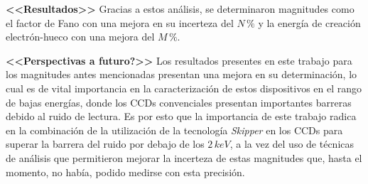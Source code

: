 \textbf{<<Resultados>>} Gracias a estos análisis, se determinaron magnitudes como el factor de Fano con una mejora en su incerteza del $N\,\%$ y la energía de creación electrón-hueco con una mejora del $M\,\%$.

\textbf{<<Perspectivas a futuro?>>} Los resultados presentes en este trabajo para los magnitudes antes mencionadas presentan una mejora en su determinación, lo cual es de vital importancia en la caracterización de estos dispositivos en el rango de bajas energías, donde los CCDs convenciales presentan importantes barreras debido al ruido de lectura. Es por esto que la importancia de este trabajo radica en la combinación de la utilización de la tecnología \textit{Skipper} en los CCDs para superar la barrera del ruido por debajo de los $2\,\si{keV}$, a la vez del uso de técnicas de análisis que permitieron mejorar la incerteza de estas magnitudes que, hasta el momento, no había, podido medirse con esta precisión.



\newpage
\thispagestyle{empty} \mbox{}
\thispagestyle{empty}
